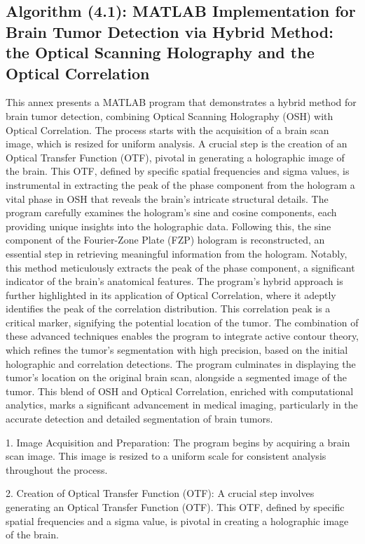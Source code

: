 \begin{appendices}
\subsection{Algorithm (4.1): MATLAB Implementation for Brain Tumor Detection via Hybrid Method: the Optical Scanning Holography and the Optical Correlation}
This annex presents a MATLAB program that demonstrates a hybrid method for brain tumor detection, combining Optical Scanning Holography (OSH) with Optical Correlation. The process starts with the acquisition of a brain scan image, which is resized for uniform analysis. A crucial step is the creation of an Optical Transfer Function (OTF), pivotal in generating a holographic image of the brain. This OTF, defined by specific spatial frequencies and sigma values, is instrumental in extracting the peak of the phase component from the hologram a vital phase in OSH that reveals the brain's intricate structural details. The program carefully examines the hologram's sine and cosine components, each providing unique insights into the holographic data. Following this, the sine component of the Fourier-Zone Plate (FZP) hologram is reconstructed, an essential step in retrieving meaningful information from the hologram. Notably, this method meticulously extracts the peak of the phase component, a significant indicator of the brain's anatomical features. The program's hybrid approach is further highlighted in its application of Optical Correlation, where it adeptly identifies the peak of the correlation distribution. This correlation peak is a critical marker, signifying the potential location of the tumor. The combination of these advanced techniques enables the program to integrate active contour theory, which refines the tumor's segmentation with high precision, based on the initial holographic and correlation detections. The program culminates in displaying the tumor's location on the original brain scan, alongside a segmented image of the tumor. This blend of OSH and Optical Correlation, enriched with computational analytics, marks a significant advancement in medical imaging, particularly in the accurate detection and detailed segmentation of brain tumors.

1. Image Acquisition and Preparation: The program begins by acquiring a brain scan image. This image is resized to a uniform scale for consistent analysis throughout the process.

2. Creation of Optical Transfer Function (OTF): A crucial step involves generating an Optical Transfer Function (OTF). This OTF, defined by specific spatial frequencies and a sigma value, is pivotal in creating a holographic image of the brain.


\end{appendices}
